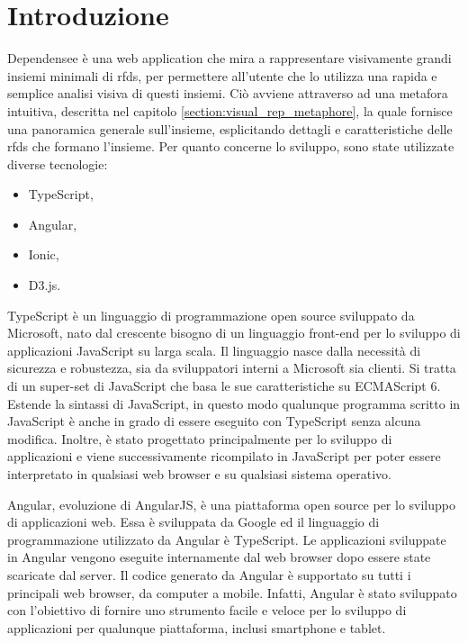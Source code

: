 \section{Introduzione} %
Dependensee \`{e} una web application che mira a rappresentare visivamente grandi insiemi minimali di \acrlong{rfds}, per permettere all'utente che lo utilizza una rapida e semplice analisi visiva di questi insiemi. Ci\`{o} avviene attraverso ad una metafora intuitiva, descritta nel capitolo \ref{section:visual_rep_metaphore}, la quale fornisce una panoramica generale sull'insieme, esplicitando dettagli e caratteristiche delle \acrlong{rfds} che formano l'insieme. Per quanto concerne lo sviluppo, sono state utilizzate diverse tecnologie:
\begin{itemize}
    \item TypeScript,
    \item Angular,
    \item Ionic,
    \item D3.js.
\end{itemize}
TypeScript \`{e} un linguaggio di programmazione open source sviluppato da Microsoft, nato dal crescente bisogno di un linguaggio front-end per lo sviluppo di applicazioni JavaScript su larga scala. Il linguaggio nasce dalla necessit\`{a} di sicurezza e robustezza, sia da sviluppatori interni a Microsoft sia clienti. Si tratta di un super-set di JavaScript che basa le sue caratteristiche su ECMAScript 6. Estende la sintassi di JavaScript, in questo modo qualunque programma scritto in JavaScript \`{e} anche in grado di essere eseguito con TypeScript senza alcuna modifica. Inoltre, \`{e} stato progettato principalmente per lo sviluppo di applicazioni e viene successivamente ricompilato in JavaScript per poter essere interpretato in qualsiasi web browser e su qualsiasi sistema operativo.\par
Angular, evoluzione di AngularJS, \`{e} una piattaforma open source per lo sviluppo di applicazioni web. Essa \`{e} sviluppata da Google ed il linguaggio di programmazione utilizzato da Angular \`{e} TypeScript. Le applicazioni sviluppate in Angular vengono eseguite internamente dal web browser dopo essere state scaricate dal server. Il codice generato da Angular \`{e} supportato su tutti i principali web browser, da computer a mobile. Infatti, Angular \`{e} stato sviluppato con l'obiettivo di fornire uno strumento facile e veloce per lo sviluppo di applicazioni per qualunque piattaforma, inclusi smartphone e tablet.\par
